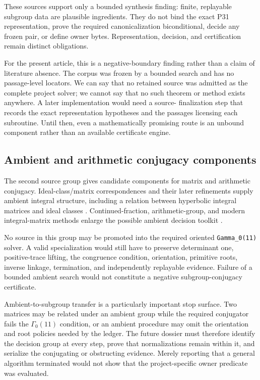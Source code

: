 \documentclass[11pt]{article}
\begin{document}
These sources support only a bounded synthesis finding: finite,
replayable subgroup data are plausible ingredients. They do not bind the
exact P31 representation, prove the required canonicalization
biconditional, decide any frozen pair, or define owner bytes.
Representation, decision, and certification remain distinct obligations.

For the present article, this is a negative-boundary finding rather than a claim of
literature absence. The corpus was frozen by a bounded search and has no
passage-level locators. We can say that no retained source was admitted
as the complete project solver; we cannot say that no such theorem or
method exists anywhere. A later implementation would need a source-
finalization step that records the exact representation hypotheses and
the passages licensing each subroutine. Until then, even a mathematically
promising route is an unbound component rather than an available
certificate engine.

\hypertarget{22-ambient-and-arithmetic-conjugacy-components}{%
\subsection{Ambient and arithmetic conjugacy
components}\label{22-ambient-and-arithmetic-conjugacy-components}}

The second source group gives candidate components for matrix and
arithmetic conjugacy. Ideal-class/matrix correspondences and their later
refinements supply ambient integral structure, including a relation
between hyperbolic integral matrices and ideal classes
\citep{P31-S07,P31-S08,P31-S09}.
Continued-fraction, arithmetic-group, and modern integral-matrix methods
enlarge the possible ambient decision toolkit
\citep{P31-S10,P31-S11,P31-S12,P31-S13}.

No source in this group may be promoted into the required oriented
\texttt{Gamma\_0(11)} solver. A valid specialization would still have to
preserve determinant one, positive-trace lifting, the congruence
condition, orientation, primitive roots, inverse linkage, termination,
and independently replayable evidence. Failure of a bounded ambient
search would not constitute a negative subgroup-conjugacy certificate.

Ambient-to-subgroup transfer is a particularly important stop surface.
Two matrices may be related under an ambient group while the required
conjugator fails the $\Gamma_0(11)$ condition, or an ambient procedure
may omit the orientation and root policies needed by the ledger. The
future dossier must therefore identify the decision group at every
step, prove that normalizations remain within it, and serialize the
conjugating or obstructing evidence. Merely reporting that a general
algorithm terminated would not show that the project-specific owner
predicate was evaluated.
\end{document}
